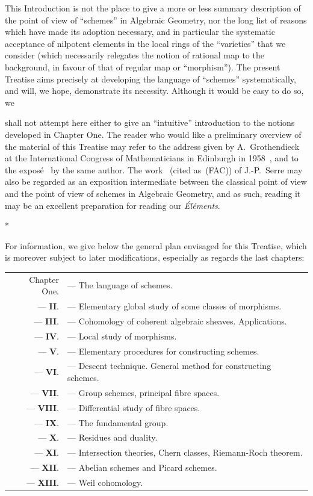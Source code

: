 This Introduction is not the place to give a more or less summary description of the point of view of ``schemes'' in Algebraic Geometry, nor the long list of reasons which have made its adoption necessary, and in particular the systematic acceptance of nilpotent elements in the local rings of the ``varieties'' that we consider (which necessarily relegates the notion of rational map to the background, in favour of that of regular map or ``morphism'').
The present Treatise aims precisely at developing the language of ``schemes'' systematically, and will, we hope, demonstrate its necessity.
Although it would be easy to do so, we

shall not attempt here either to give an ``intuitive'' introduction to the notions developed in Chapter One.
The reader who would like a preliminary overview of the material of this Treatise may refer to the address given by A.~Grothendieck at the International Congress of Mathematicians in Edinburgh in 1958~\cite{I-7}, and to the exposé~\cite{I-8} by the same author.
The work~\cite{I-14} (cited as~(FAC)) of J.-P.~Serre may also be regarded as an exposition intermediate between the classical point of view and the point of view of schemes in Algebraic Geometry, and as such, reading it may be an excellent preparation for reading our \emph{Éléments}.

\bigskip
\begin{center}*\quad*\quad*\end{center}
\bigskip

For information, we give below the general plan envisaged for this Treatise, which is moreover subject to later modifications, especially as regards the last chapters:

\medskip
\begin{tabular}{rl}
  Chapter One. & --- The language of schemes.\\
  --- \textbf{II}. & --- Elementary global study of some classes of morphisms.\\
  --- \textbf{III}. & --- Cohomology of coherent algebraic sheaves. Applications.\\
  --- \textbf{IV}. & --- Local study of morphisms.\\
  --- \textbf{V}. & --- Elementary procedures for constructing schemes.\\
  --- \textbf{VI}. & --- Descent technique. General method for constructing schemes.\\
  --- \textbf{VII}. & --- Group schemes, principal fibre spaces.\\
  --- \textbf{VIII}. & --- Differential study of fibre spaces.\\
  --- \textbf{IX}. & --- The fundamental group.\\
  --- \textbf{X}. & --- Residues and duality.\\
  --- \textbf{XI}. & --- Intersection theories, Chern classes, Riemann-Roch theorem.\\
  --- \textbf{XII}. & --- Abelian schemes and Picard schemes.\\
  --- \textbf{XIII}. & --- Weil cohomology.\\
\end{tabular}
\medskip

